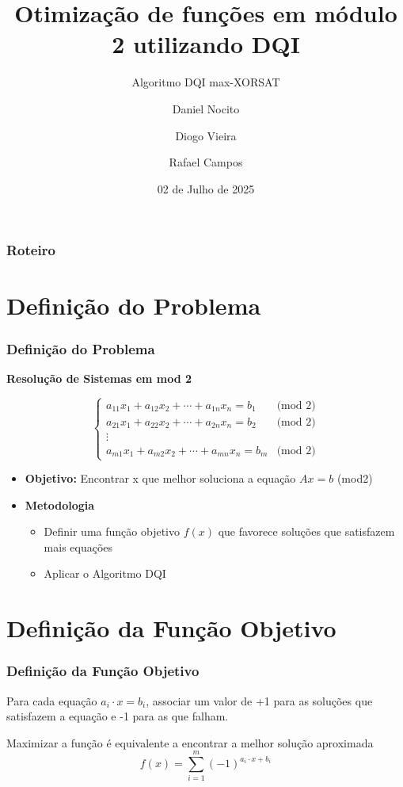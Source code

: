 \documentclass[aspectratio=169]{beamer}
\title{Otimização de funções em módulo 2 utilizando DQI}
\subtitle{Algoritmo DQI max-XORSAT}
\author{Daniel Nocito \and Diogo Vieira \and Rafael Campos}
\institute{UFRJ}
\date{02 de Julho de 2025}
\begin{document}
\begin{frame}
  \titlepage
\end{frame}

\begin{frame}
  \frametitle{Roteiro}
  \tableofcontents
\end{frame}

\section{Definição do Problema}

\begin{frame}
  \frametitle{Definição do Problema}
  \begin{center}
      \textbf{Resolução de Sistemas em mod 2}
  \end{center}
  \[
    \begin{cases} 
      a_{11} x_1 + a_{12} x_2 + \cdots + a_{1n}x_n = b_1 & \text{(mod 2)} \\
      a_{21} x_1 + a_{22} x_2 + \cdots + a_{2n}x_n = b_2 & \text{(mod 2)} \\
      \vdots \\
      a_{m1} x_1 + a_{m2} x_2 + \cdots + a_{mn}x_n = b_m & \text{(mod 2)}
    \end{cases}
    \]
  \begin{itemize} 
    \item \textbf{Objetivo:} Encontrar x que melhor soluciona a equação $Ax=b$ (mod2)
    \item \textbf{Metodologia}
    \begin{itemize}
        \item Definir uma função objetivo $f(x)$ que favorece soluções que satisfazem mais equações
        \item Aplicar o Algoritmo DQI
    \end{itemize}
  \end{itemize}
\end{frame}

\section{Definição da Função Objetivo}

\begin{frame}
  \frametitle{Definição da Função Objetivo}
  
  Para cada equação $a_i \cdot x = b_i$, associar um valor de +1 para as soluções que satisfazem a equação e -1 para as que falham.

  \vspace{1cm}
  
  \begin{block}{Maximizar a função é equivalente a encontrar a melhor solução aproximada}
  \[
    f(x)=\sum_{i=1}^m (-1)^{a_i \cdot x + b_i}
  \]
  \end{block}
\end{frame}
\end{document}
